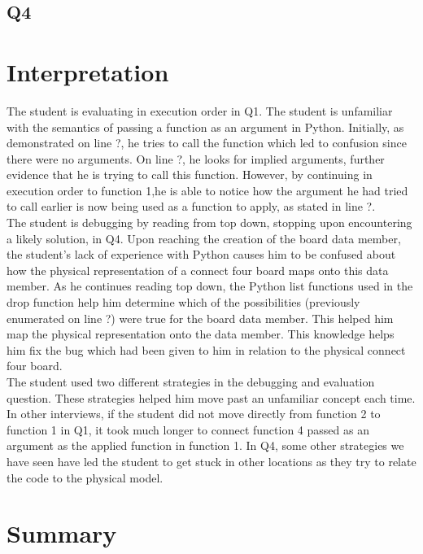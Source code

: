 \documentclass{article}
\begin{document}
\subsection{Q4}

\section{Interpretation}

The student is evaluating in execution order in Q1.
The student is unfamiliar with the semantics of passing a function as an argument in Python.
Initially, as demonstrated on line ?, he tries to call the function which led to confusion since there were no arguments. On line ?, he looks for implied arguments, further evidence that he is trying to call this function.
However, by continuing in execution order to function 1,he is able to notice how the argument he had tried to call earlier is now being used as a function to apply, as stated in line ?.  \\

The student is debugging by reading from top down, stopping upon encountering a likely solution, in Q4.
Upon reaching the creation of the board data member, the student's lack of experience with Python causes him to be confused about how the physical representation of a connect four board maps onto this data member.
As he continues reading top down, the Python list functions used in the drop function help him determine which of the possibilities (previously enumerated on line ?) were true for the board data member.
This helped him map the physical representation onto the data member.
This knowledge helps him fix the bug which had been given to him in relation to the physical connect four board.  \\

The student used two different strategies in the debugging and evaluation question.
These strategies helped him move past an unfamiliar concept each time. 
In other interviews, if the student did not move directly from function 2 to function 1 in Q1, it took much longer to connect function 4 passed as an argument as the applied function in function 1.
In Q4, some other strategies we have seen have led the student to get stuck in other locations as they try to relate the code to the physical model. 







\section{Summary}
\end{document}
